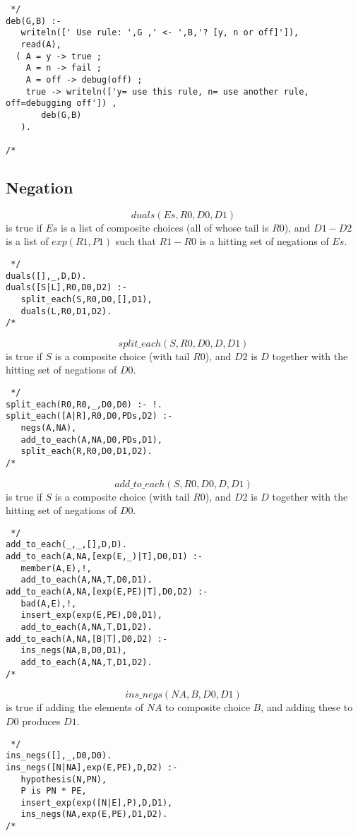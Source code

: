 \documentclass[11pt,fleqn]{article}
\begin{document}
\begin{verbatim} */
deb(G,B) :-
   writeln([' Use rule: ',G ,' <- ',B,'? [y, n or off]']),
   read(A),
  ( A = y -> true ;
    A = n -> fail ;
    A = off -> debug(off) ;
    true -> writeln(['y= use this rule, n= use another rule, off=debugging off']) ,
       deb(G,B)
   ).

/* \end{verbatim}
\subsection{Negation}
\[duals(Es,R0,D0,D1)\]
is true if $Es$ is a list of composite choices (all of whose tail is
$R0$), and $D1-D2$ is a list of $exp(R1,P1)$ such that $R1-R0$ is a
hitting set of negations of $Es$.
\begin{verbatim} */
duals([],_,D,D).
duals([S|L],R0,D0,D2) :-
   split_each(S,R0,D0,[],D1),
   duals(L,R0,D1,D2).
/* \end{verbatim}

\[split\_each(S,R0,D0,D,D1)\]
is true if $S$ is a composite choice (with tail $R0$), and
$D2$ is $D$ together with the hitting set of negations of $D0$.
\begin{verbatim} */
split_each(R0,R0,_,D0,D0) :- !.
split_each([A|R],R0,D0,PDs,D2) :-
   negs(A,NA),
   add_to_each(A,NA,D0,PDs,D1),
   split_each(R,R0,D0,D1,D2).
/* \end{verbatim}

\[add\_to\_each(S,R0,D0,D,D1)\]
is true if $S$ is a composite choice (with tail $R0$), and
$D2$ is $D$ together with the hitting set of negations of $D0$.
\begin{verbatim} */
add_to_each(_,_,[],D,D).
add_to_each(A,NA,[exp(E,_)|T],D0,D1) :-
   member(A,E),!,
   add_to_each(A,NA,T,D0,D1).
add_to_each(A,NA,[exp(E,PE)|T],D0,D2) :-
   bad(A,E),!,
   insert_exp(exp(E,PE),D0,D1),
   add_to_each(A,NA,T,D1,D2).
add_to_each(A,NA,[B|T],D0,D2) :-
   ins_negs(NA,B,D0,D1),
   add_to_each(A,NA,T,D1,D2).
/* \end{verbatim}

\[ins\_negs(NA,B,D0,D1)\]
is true if adding the elements of $NA$ to composite choice $B$, and
adding these to $D0$ produces $D1$.
\begin{verbatim} */
ins_negs([],_,D0,D0).
ins_negs([N|NA],exp(E,PE),D,D2) :-
   hypothesis(N,PN),
   P is PN * PE,
   insert_exp(exp([N|E],P),D,D1),
   ins_negs(NA,exp(E,PE),D1,D2).
/* \end{verbatim}
\end{document}
